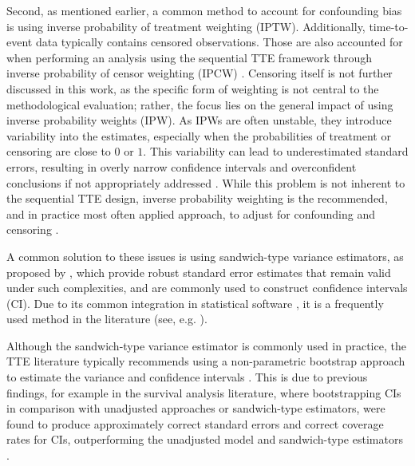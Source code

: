 \documentclass[pdflatex,sn-vancouver-ay]{sn-jnl}%
\theoremstyle{thmstyleone}%
\theoremstyle{thmstyletwo}%
\theoremstyle{thmstylethree}%
\begin{document}
Second, as mentioned earlier, a common method to account for confounding bias is using inverse probability of treatment weighting (IPTW). Additionally, time-to-event data typically contains censored observations. Those are also accounted for when performing an analysis using the sequential TTE framework through inverse probability of censor weighting (IPCW) \citep{hernanObservationalStudiesAnalyzed2008}. Censoring itself is not further discussed in this work, as the specific form of weighting is not central to the methodological evaluation; rather, the focus lies on the general impact of using inverse probability weights (IPW). As IPWs are often unstable, they introduce variability into the estimates, especially when the probabilities of treatment or censoring are close to $0$ or $1$. This variability can lead to underestimated standard errors, resulting in overly narrow confidence intervals and overconfident conclusions if not appropriately addressed \citep{austinMovingBestPractice2015, austinVarianceEstimationWhen2016}. While this problem is not inherent to the sequential TTE design, inverse probability weighting is the recommended, and in practice most often applied approach, to adjust for confounding and censoring \citep{hernanTargetTrialFramework2025, hernanObservationalStudiesAnalyzed2008}.

A common solution to these issues is using sandwich-type variance estimators, as proposed by \cite{linRobustInferenceCox1989}, which provide robust standard error estimates that remain valid under such complexities, and are commonly used to construct confidence intervals (CI). Due to its common integration in statistical software \citep{hernanCausalInferenceWhat}, it is a frequently used method in the literature (see, e.g. \cite{wuOutcomesReinitiatingDirect2025, liADHDPharmacotherapyMortality2024, scolaImplementationTrialEmulation2023}). 

Although the sandwich-type variance estimator is commonly used in practice, the TTE literature typically recommends using a non-parametric bootstrap approach to estimate the variance and confidence intervals \citep{maringeReflectionModernMethods2020, hernanUsingBigData2016, bakkerAnalysingElectronicHealth2021}. This is due to previous findings, for example in the survival analysis literature, where bootstrapping CIs in comparison with unadjusted approaches or sandwich-type estimators, were found to produce approximately correct standard errors and correct coverage rates for CIs, outperforming the unadjusted model and sandwich-type estimators \citep{austinVarianceEstimationWhen2016}.
\end{document}

